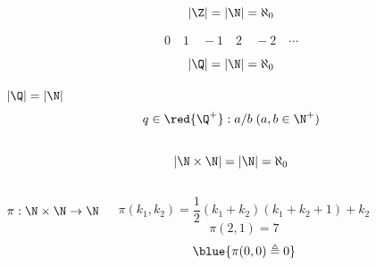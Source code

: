 \begin{frame}{}
\end{frame}

\begin{frame}{}
  \begin{theorem}[$\Z$ is Countable.]
    \[
      |\Z| = |\N| = \aleph_{0}
    \]
  \end{theorem}


  \pause
  \[
    0 \quad 1 \quad -1 \quad 2 \quad -2 \quad \cdots
  \]
\end{frame}

\begin{frame}{}
  \begin{theorem}
    \[
      |\Q| = |\N| = \aleph_{0}
    \]
  \end{theorem}

  \pause
  \begin{exampleblock}{$|\Q| = |\N|$}
    \[
      q \in \red{\Q^{+}}: a / b \; (a,b \in \N^{+})
    \]

    \pause
    \vspace{-0.30cm}
    \begin{columns}
        \pause
    \end{columns}
  \end{exampleblock}
\end{frame}

\begin{frame}{}
  \begin{theorem}
    \[
      |\N \times \N| = |\N| = \aleph_{0}
    \]
  \end{theorem}

  \begin{columns}
      \pause
      \[
        \pi: \N \times \N \to \N
      \]

      \pause
      \[
        \pi(k_1, k_2) = \frac{1}{2} (k_1 + k_2)(k_1 + k_2 + 1) + k_2
      \]
      \[
        \pi(2, 1) = 7
      \]
      \[
        \blue{\pi(0, 0) \triangleq 0}
      \]
  \end{columns}

  \pause
  \begin{center}
  \end{center}
\end{frame}

